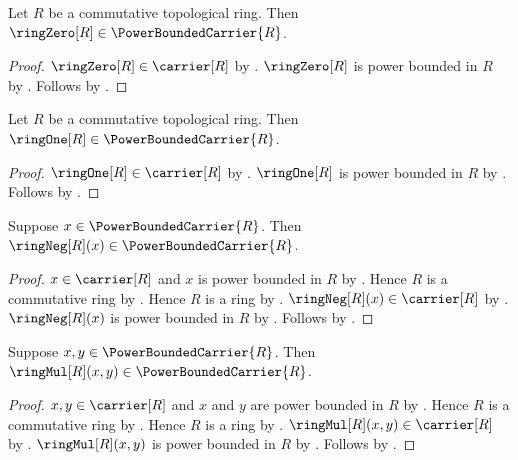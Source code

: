 \begin{proposition}\label{ring_zero_in_power_bounded_carrier}
    Let $R$ be a commutative topological ring.
    Then $\ringZero[R]\in\PowerBoundedCarrier{R}$.
\end{proposition}
\begin{proof}
    $\ringZero[R]\in\carrier[R]$ by
        .
    $\ringZero[R]$ is power bounded in $R$ by
        .
    Follows by .
\end{proof}

\begin{proposition}\label{ring_one_in_power_bounded_carrier}
    Let $R$ be a commutative topological ring.
    Then $\ringOne[R]\in\PowerBoundedCarrier{R}$.
\end{proposition}
\begin{proof}
    $\ringOne[R]\in\carrier[R]$ by
        .
    $\ringOne[R]$ is power bounded in $R$ by
        .
    Follows by .
\end{proof}

\begin{proposition}\label{power_bounded_carrier_negation}
    Suppose $x\in\PowerBoundedCarrier{R}$.
    Then $\ringNeg[R](x)\in\PowerBoundedCarrier{R}$.
\end{proposition}
\begin{proof}
    $x\in\carrier[R]$ and $x$ is power bounded in $R$ by
        .
    Hence $R$ is a commutative ring by
        .
    Hence $R$ is a ring by .
    $\ringNeg[R](x)\in\carrier[R]$ by .
    $\ringNeg[R](x)$ is power bounded in $R$ by
        .
    Follows by .
\end{proof}

\begin{proposition}\label{power_bounded_carrier_multiplication}
    Suppose $x,y\in\PowerBoundedCarrier{R}$.
    Then $\ringMul[R](x,y)\in\PowerBoundedCarrier{R}$.
\end{proposition}
\begin{proof}
    $x,y\in\carrier[R]$ and $x$ and $y$ are power bounded in $R$ by
        .
    Hence $R$ is a commutative ring by
        .
    Hence $R$ is a ring by .
    $\ringMul[R](x,y)\in\carrier[R]$ by .
    $\ringMul[R](x,y)$ is power bounded in $R$ by
        .
    Follows by .
\end{proof}

